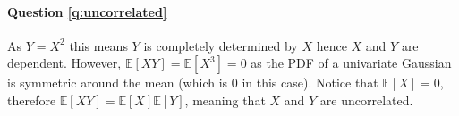 \paragraph{Question \ref{q:uncorrelated}}
As $Y = X^2$ this means $Y$ is completely determined by $X$ hence $X$ and $Y$ are dependent. However, $\mathbb{E}[XY] = \mathbb{E}[X^3] = 0$ as the PDF of a univariate Gaussian is symmetric around the mean (which is 0 in this case). Notice that $\mathbb{E}[X] = 0$, therefore $\mathbb{E}[XY] = \mathbb{E}[X] \mathbb{E}[Y]$, meaning that $X$ and $Y$ are uncorrelated.

